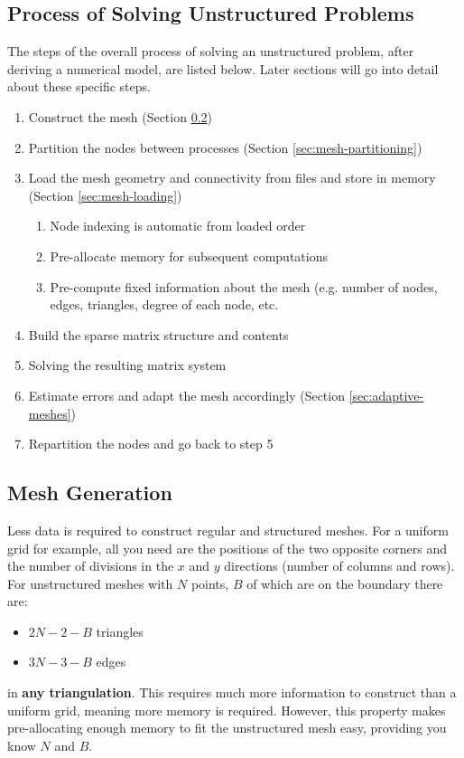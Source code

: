 \documentclass{article}
\begin{document}
\subsection{Process of Solving Unstructured Problems}

The steps of the overall process of solving an unstructured problem, after deriving a numerical model, are listed below. Later sections will go into detail about these specific steps.
\begin{enumerate}
	\item Construct the mesh (Section \ref{sec:mesh-generation})
	\item Partition the nodes between processes  (Section \ref{sec:mesh-partitioning})
	\item Load the mesh geometry and connectivity from files and store in memory (Section \ref{sec:mesh-loading})
	\begin{enumerate}
		\item Node indexing is automatic from loaded order
		\item Pre-allocate memory for subsequent computations
		\item Pre-compute fixed information about the mesh (e.g. number of nodes, edges, triangles, degree of each node, etc.
	\end{enumerate}
	\item Build the sparse matrix structure and contents
	\item Solving the resulting matrix system
	\item Estimate errors and adapt the mesh accordingly (Section \ref{sec:adaptive-meshes})
	\item Repartition the nodes and go back to step 5
\end{enumerate}

\subsection{Mesh Generation}
\label{sec:mesh-generation}

Less data is required to construct regular and structured meshes. For a uniform grid for example, all you need are the positions of the two opposite corners and the number of divisions in the $x$ and $y$ directions (number of columns and rows). For unstructured meshes with $N$ points, $B$ of which are on the boundary there are:
\begin{itemize}
	\item $2N - 2 - B$ triangles
	\item $3N - 3 - B$ edges
\end{itemize}
in \textbf{any triangulation}. This requires much more information to construct than a uniform grid, meaning more memory is required. However, this property makes pre-allocating enough memory to fit the unstructured mesh easy, providing you know $N$ and $B$.
\end{document}
